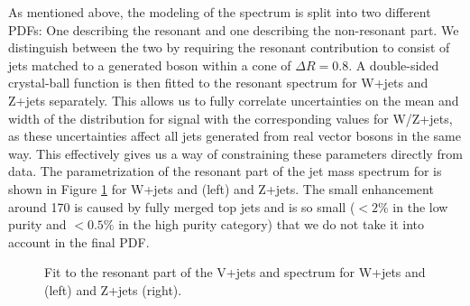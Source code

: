 As mentioned above, the modeling of the \MJ spectrum is split into two different PDFs: One describing the resonant and one describing the non-resonant part. We distinguish between the two by requiring the resonant contribution to consist of jets matched to a generated boson within a cone of $\Delta R = 0.8$. A double-sided crystal-ball function is then fitted to the resonant spectrum for W+jets and Z+jets separately. This allows us to fully correlate uncertainties on the mean and width of the \MJ distribution for signal with the corresponding values for W/Z+jets, as these uncertainties affect all jets generated from real vector bosons in the same way. This effectively gives us a way of constraining these parameters directly from data. The parametrization of the resonant part of the jet mass spectrum for \MJO is shown in Figure \ref{fig:Vjets_fits} for W+jets and \ttbar (left) and Z+jets. The small enhancement around 170 \GeV is caused by fully merged top jets and is so small ($<2\%$ in the low purity and $<0.5\%$ in the high purity category) that we do not take it into account in the final PDF.
\begin{figure}[h!]
\centering
{}
\caption{Fit to the resonant part of the V+jets and \ttbar spectrum for W+jets and \ttbar (left) and Z+jets (right).}
\label{fig:Vjets_fits}
\end{figure}
